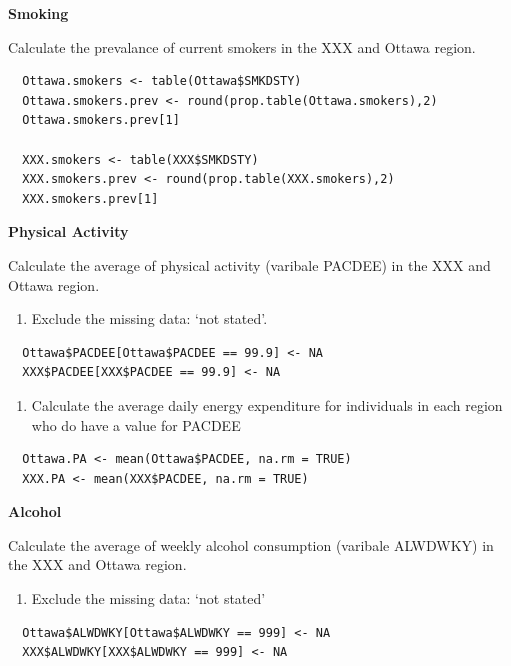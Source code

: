 \documentclass[]{book}
\providecommand{\tightlist}{%
  \setlength{\itemsep}{0pt}\setlength{\parskip}{0pt}}
\begin{document}
\textbf{Smoking}

Calculate the prevalance of current smokers in the XXX and Ottawa
region.

\begin{verbatim}
  Ottawa.smokers <- table(Ottawa$SMKDSTY)
  Ottawa.smokers.prev <- round(prop.table(Ottawa.smokers),2)
  Ottawa.smokers.prev[1]
  
  XXX.smokers <- table(XXX$SMKDSTY)
  XXX.smokers.prev <- round(prop.table(XXX.smokers),2)
  XXX.smokers.prev[1]
\end{verbatim}

\textbf{Physical Activity}

Calculate the average of physical activity (varibale PACDEE) in the XXX
and Ottawa region.

\begin{enumerate}
\def\labelenumi{\alph{enumi}.}
\tightlist
\item
  Exclude the missing data: `not stated'.
\end{enumerate}

\begin{verbatim}
  Ottawa$PACDEE[Ottawa$PACDEE == 99.9] <- NA
  XXX$PACDEE[XXX$PACDEE == 99.9] <- NA
\end{verbatim}

\begin{enumerate}
\def\labelenumi{\alph{enumi}.}
\setcounter{enumi}{1}
\tightlist
\item
  Calculate the average daily energy expenditure for individuals in each
  region who do have a value for PACDEE
\end{enumerate}

\begin{verbatim}
  Ottawa.PA <- mean(Ottawa$PACDEE, na.rm = TRUE)
  XXX.PA <- mean(XXX$PACDEE, na.rm = TRUE)
\end{verbatim}

\textbf{Alcohol}

Calculate the average of weekly alcohol consumption (varibale ALWDWKY)
in the XXX and Ottawa region.

\begin{enumerate}
\def\labelenumi{\alph{enumi}.}
\tightlist
\item
  Exclude the missing data: `not stated'
\end{enumerate}

\begin{verbatim}
  Ottawa$ALWDWKY[Ottawa$ALWDWKY == 999] <- NA
  XXX$ALWDWKY[XXX$ALWDWKY == 999] <- NA
\end{verbatim}
\end{document}
